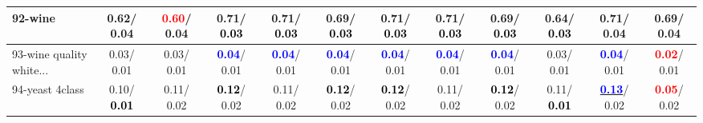 \begin{table}[h]
\begin{center}
{\begin{tabular}{lc|c|c|c|c|c|c|c|c|c|c}
92-wine &   0.62/  0.04 & \textcolor{red}{\textbf{  0.60}}/  0.04 &   0.71/\textcolor{black}{\textbf{  0.03}} &   0.71/\textcolor{black}{\textbf{  0.03}} &   0.69/\textcolor{black}{\textbf{  0.03}} &   0.71/\textcolor{black}{\textbf{  0.03}} &   0.71/\textcolor{black}{\textbf{  0.03}} &   0.69/\textcolor{black}{\textbf{  0.03}} &   0.64/\textcolor{black}{\textbf{  0.03}} &   0.71/  0.04 &   0.69/  0.04 \\ \hline
93-wine quality white... &   0.03/  0.01 &   0.03/  0.01 & \textcolor{blue}{\textbf{  0.04}}/  0.01 & \textcolor{blue}{\textbf{  0.04}}/  0.01 & \textcolor{blue}{\textbf{  0.04}}/  0.01 & \textcolor{blue}{\textbf{  0.04}}/  0.01 & \textcolor{blue}{\textbf{  0.04}}/  0.01 & \textcolor{blue}{\textbf{  0.04}}/  0.01 &   0.03/  0.01 & \textcolor{blue}{\textbf{  0.04}}/  0.01 & \textcolor{red}{\textbf{  0.02}}/  0.01 \\
94-yeast 4class &   0.10/\textcolor{black}{\textbf{  0.01}} &   0.11/  0.02 & \textcolor{black}{\textbf{  0.12}}/  0.02 &   0.11/  0.02 & \textcolor{black}{\textbf{  0.12}}/  0.02 & \textcolor{black}{\textbf{  0.12}}/  0.02 &   0.11/  0.02 & \textcolor{black}{\textbf{  0.12}}/  0.02 &   0.11/\textcolor{black}{\textbf{  0.01}} & \underline{\textcolor{blue}{\textbf{  0.13}}}/  0.02 & \textcolor{red}{\textbf{  0.05}}/  0.02 \\\end{tabular}}\label{stratsALCKappa2aCIELMRedux}
\end{center}
\end{table}
